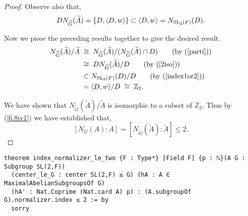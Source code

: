 \begin{proof}
  Observe also that, 
  \begin{align}\label{index1or2} DN_{\widetilde{G}}({\widetilde{A}}) = \{ D, \langle D, w \rangle \} \subset \langle D, w \rangle = N_{\operatorname{SL}_2(F)}(D).
  \end{align}
  
  Now we piece the preceding results together to give the desired result.
  \begin{align*}  N_{\widetilde{G}}({\widetilde{A}}) / {\widetilde{A}} \; & \cong \;  N_{\widetilde{G}}({\widetilde{A}})/( N_{\widetilde{G}}({\widetilde{A}}) \cap D) \tag{by (\ref{parti})}
  \\ & \cong \; DN_{\widetilde{G}}({\widetilde{A}}) / D \tag{by (\ref{2iso})}
  \\ & \subset N_{\SL_2(F)}(D) / D \tag{by (\ref{index1or2})}
  \\ &= \langle D, w \rangle / D \; \cong \; \mathbb{Z}_2.
  \end{align*}
  
  We have shown that $N_{\widetilde{G}}({\widetilde{A}}) / {\widetilde{A}}$ is isomorphic to a subset of $\mathbb{Z}_2$. Thus by (\ref{6.8iv1}) we have established that, $$[N_G(A): A] = [N_{\widetilde{G}}({\widetilde{A}}): {\widetilde{A}}] \leq 2.$$
  \vspace{-2mm}
\end{proof}
\begin{footnotesize}
\begin{verbatim}
theorem index_normalizer_le_two {F : Type*} [Field F] {p : ℕ}(A G : Subgroup SL(2,F))
  (center_le_G : center SL(2,F) ≤ G) (hA : A ∈ MaximalAbelianSubgroupsOf G)
  (hA' : Nat.Coprime (Nat.card A) p) : (A.subgroupOf G).normalizer.index ≤ 2 := by
  sorry
\end{verbatim}
\end{footnotesize}


